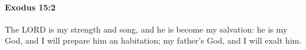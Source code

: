 
		\paragraph{Exodus 15:2} %
			\label{EXODUS-15-2}

			The LORD is my strength and song, and he is become my salvation: he is my God, and I will prepare him an habitation; my father's God, and I will exalt him.


